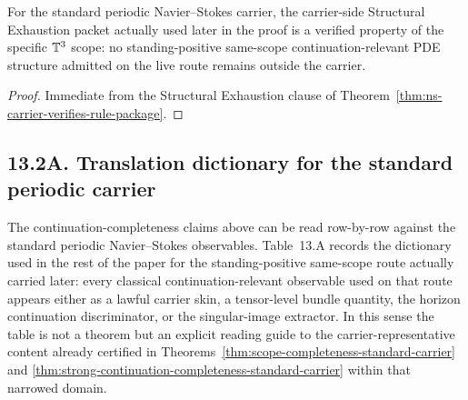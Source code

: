 \begin{corollary}
\label{cor:structural-exhaustion-verified-standard-carrier}
For the standard periodic Navier--Stokes carrier, the carrier-side Structural Exhaustion packet actually used later in the proof is a verified property of the specific $\mathbb{T}^3$ scope: no standing-positive same-scope continuation-relevant PDE structure admitted on the live route remains outside the carrier.
\end{corollary}

\begin{proof}
Immediate from the Structural Exhaustion clause of
Theorem~\ref{thm:ns-carrier-verifies-rule-package}.
\end{proof}



\subsection*{13.2A. Translation dictionary for the standard periodic carrier}

The continuation-completeness claims above can be read row-by-row against the standard periodic
Navier--Stokes observables. Table~13.A records the dictionary used in the rest of the paper for the
standing-positive same-scope route actually carried later: every classical continuation-relevant
observable used on that route appears either as a lawful carrier skin, a tensor-level bundle
quantity, the horizon continuation discriminator, or the singular-image extractor. In this sense the
table is not a theorem but an explicit reading guide to the carrier-representative content
already certified in Theorems~\ref{thm:scope-completeness-standard-carrier} and
\ref{thm:strong-continuation-completeness-standard-carrier} within that narrowed domain.

